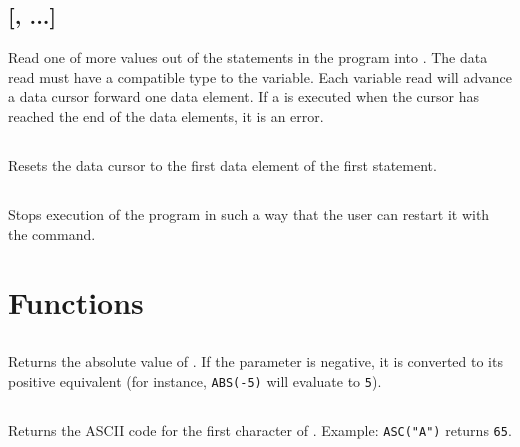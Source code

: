 \documentclass{report}
\begin{document}
    \subsection*{ [, ...]}

    Read one of more values out of the  statements in the program into
    .
    The data read must have a compatible type to the variable.
    Each variable read will advance a data cursor forward one data element.
    If a  is executed when the cursor has reached the end of the data
    elements, it is an error.

    \subsection*{}

    Resets the data cursor to the first data element of the first  statement.

    \subsection*{}

    Stops execution of the program in such a way that the user can restart it with the
     command.

    \section*{Functions}

    \subsection*{}

    Returns the absolute value of .
    If the parameter is negative, it is converted to its positive equivalent
    (for instance, \verb+ABS(-5)+ will evaluate to \verb+5+).

    \subsection*{}

    Returns the ASCII code for the first character of .
    Example: \verb+ASC("A")+ returns \verb+65+.

    \subsection*{}
\end{document}
